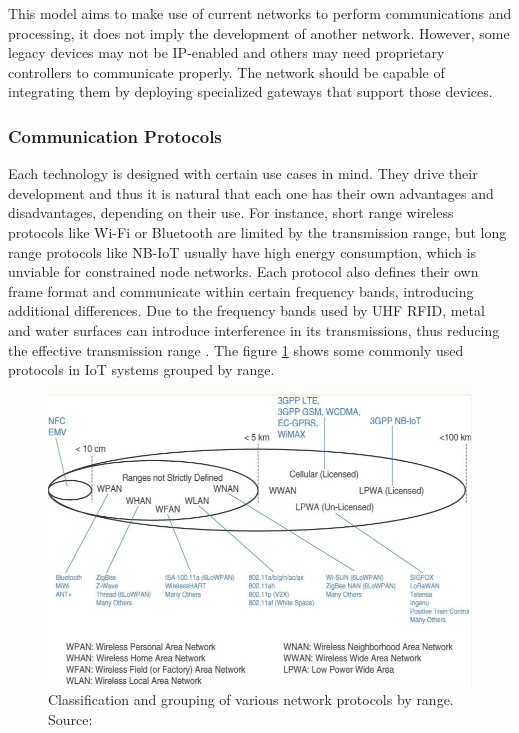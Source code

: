 This model aims to make use of current networks to perform communications and processing, it does not imply the development of another network. However, some legacy devices may not be IP-enabled and others may need proprietary controllers to communicate properly. The network should be capable of integrating them by deploying specialized gateways that support those devices. 

\subsubsection{Communication Protocols}
Each technology is designed with certain use cases in mind. They drive their development and thus it is natural that each one has their own advantages and disadvantages, depending on their use. For instance, short range wireless protocols like Wi-Fi or Bluetooth are limited by the transmission range, but long range protocols like NB-IoT usually have high energy consumption, which is unviable for constrained node networks. Each protocol also defines their own frame format and communicate within certain frequency bands, introducing additional differences. Due to the frequency bands used by UHF \acs{RFID}, metal and water surfaces can introduce interference in its transmissions, thus reducing the effective transmission range \cite{Cairo2018}. The figure \ref{fig:communication-protocols} shows some commonly used protocols in \acs{IoT} systems grouped by range. 


\begin{figure}[H]
    \centering
    \includegraphics[width=0.85\linewidth]{images/communication-protocols.png}
    \caption[Classification and grouping of various network protocols by range.]{ Classification and grouping of various network protocols by range. Source: \cite{10.5555/3161403}}
    \label{fig:communication-protocols}
\end{figure}

